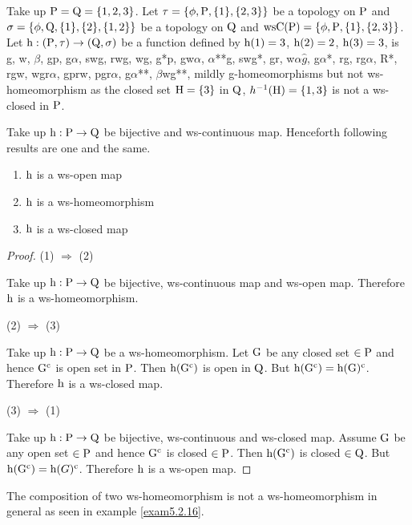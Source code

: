 \begin{exm}\label{exm5.2.13}
Take up $\mathrm{P}=\mathrm{Q}= \{1, 2, 3\}$. Let $\tau= \{\phi, \mathrm{P}, \{1\}, \{2,3\}\}$ be a topology on $\mathrm{P}$ and $\sigma=\{\phi, \mathrm{Q}, \{1\},\{2\}, \{1,2\}\}$ be a topology on $\mathrm{Q}$ and $\mathrm{ws}\mathrm{C}(\mathrm{P})= \{\phi, \mathrm{P},\{1\},\{2,3\}\}$. Let $\mathrm{h}: (\mathrm{P}, \tau )\to (\mathrm{Q}, \sigma)$ be a function defined by $\mathrm{h}(1)=3$, $\mathrm{h}(2)= 2$, $\mathrm{h}(3)=3$, is g, w, $\beta$, gp, g$\alpha$, swg, rwg, wg, g*p, gw$\alpha$, $\alpha${*}{*}g, swg*, gr, w$\alpha\hat{g}$, g$\alpha$*, rg, rg$\alpha$, R*, rgw, wgr$\alpha$, gprw, pgr$\alpha$, g$\alpha${*}{*}, $\beta$wg{*}{*}, mildly g-homeomorphisms but not ws-homeomorphism as the closed set $\mathrm{H}=\{3\}$ in $\mathrm{Q}$, $h^{-1} (\mathrm{H})=\{1,3\}$ is not a ws-closed in $\mathrm{P}$.
\end{exm}

\begin{thm}\label{thm5.2.14}
Take up $\mathrm{h}: \mathrm{P}\to \mathrm{Q}$ be bijective and ws-continuous map. Henceforth following results are one and the same.
\begin{enumerate}[(1)]
\item $\mathrm{h}$ is a ws-open map
\item $\mathrm{h}$ is a ws-homeomorphism
\item $\mathrm{h}$ is a ws-closed map
\end{enumerate}
\end{thm}

\begin{proof}
(1) $\Rightarrow$ (2)

Take up $\mathrm{h}: \mathrm{P}\to \mathrm{Q}$ be bijective, ws-continuous map and ws-open map. Therefore $\mathrm{h}$ is a ws-homeomorphism.

(2) $\Rightarrow$ (3)

Take up $\mathrm{h}: \mathrm{P}\to \mathrm{Q}$ be a ws-homeomorphism. Let $\mathrm{G}$ be any closed set $\in \mathrm{P}$ and hence $\mathrm{G}^{\text{c}}$ is open set in $\mathrm{P}$. Then $\mathrm{h}(\mathrm{G}^{\text{c}})$ is open in $\mathrm{Q}$. But $\mathrm{h}(\mathrm{G}^{\text{c}})=\mathrm{h}(\mathrm{G})^{\text{c}}$. Therefore $\mathrm{h}$ is a ws-closed map.

(3) $\Rightarrow$ (1)

Take up $\mathrm{h}: \mathrm{P}\to \mathrm{Q}$ be bijective, ws-continuous and ws-closed map. Assume $\mathrm{G}$ be any open set $\in \mathrm{P}$ and hence $\mathrm{G}^{\text{c}}$ is closed $\in \mathrm{P}$. Then $\mathrm{h}(\mathrm{G}^{\text{c}})$ is closed $\in \mathrm{Q}$. But $\mathrm{h}(\mathrm{G}^{\text{c}})=\mathrm{h}(G)^{\text{c}}$. Therefore $\mathrm{h}$ is a ws-open map.
\end{proof}

\begin{rem}\label{rem5.2.15}
The composition of two ws-homeomorphism is not a ws-homeomor\-phism in general as seen in example \ref{exam5.2.16}.
\end{rem}

